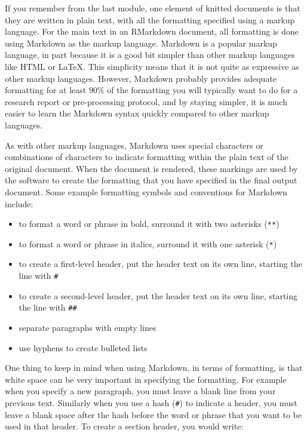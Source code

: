 \documentclass[]{tufte-book}
\providecommand{\tightlist}{%
  \setlength{\itemsep}{0pt}\setlength{\parskip}{0pt}}
\begin{document}
If you remember from the last module, one element of knitted documents is
that they are written in plain text, with all the formatting specified
using a markup language.
For the main text in an RMarkdown document, all formatting is done using
Markdown as the markup language. Markdown is a popular markup language, in part
because it is a good bit simpler than other markup languages like HTML or LaTeX.
This simplicity means that it is not quite as expressive as other markup
languages. However, Markdown probably provides adequate formatting for at least 90\% of the
formatting you will typically want to do for a research report or
pre-processing protocol, and by staying simpler, it is much easier to learn the
Markdown syntax quickly compared to other markup languages.

As with other markup languages, Markdown uses special characters or combinations of characters to indicate formatting within the plain text of the original document. When the document is rendered, these markings are used by the software to create the formatting that you have specified in the final output document. Some example formatting symbols and conventions for Markdown include:

\begin{itemize}
\tightlist
\item
  to format a word or phrase in bold, surround it with two asterisks (\texttt{**})
\item
  to format a word or phrase in italics, surround it with one asterisk (\texttt{*})
\item
  to create a first-level header, put the header text on its own line, starting the line with \texttt{\#}
\item
  to create a second-level header, put the header text on its own line, starting the line with \texttt{\#\#}
\item
  separate paragraphs with empty lines
\item
  use hyphens to create bulleted lists
\end{itemize}

One thing to keep in mind when using Markdown, in terms of formatting, is that
white space can be very important in specifying the formatting. For example when
you specify a new paragraph, you must leave a blank line from your previous
text. Similarly when you use a hash (\texttt{\#}) to indicate a header, you must leave a
blank space after the hash before the word or phrase that you want to be used in
that header. To create a section header, you would write:
\end{document}
